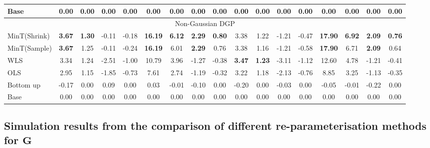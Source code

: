 \documentclass[12pt]{article}
\theoremstyle{definition}
\begin{document}
\begin{table}[H]
{\begin{tabular}{lcccccccccccccccc}
			Base & 0.00 & 0.00 & 0.00 & 0.00 & 0.00 & 0.00 & 0.00 & 0.00 & 0.00 & 0.00 & 0.00 & 0.00 & 0.00 & 0.00 & 0.00 & 0.00\\
			\toprule
			\multicolumn{17}{c}{Non-Gaussian DGP}\\
			\toprule
			
			MinT(Shrink) & \textbf{3.67} & \textbf{1.30} & -0.11 & -0.18 & \textbf{16.19} & \textbf{6.12} & \textbf{2.29} & \textbf{0.80} & 3.38 & 1.22 & -1.21 & -0.47 & \textbf{17.90} & \textbf{6.92} & \textbf{2.09} & \textbf{0.76}\\
			
			MinT(Sample) & \textbf{3.67} & 1.25 & -0.11 & -0.24 & \textbf{16.19} & 6.01 & \textbf{2.29} & 0.76 & 3.38 & 1.16 & -1.21 & -0.58 & \textbf{17.90} & 6.71 & \textbf{2.09} & 0.64\\
			
			WLS & 3.34 & 1.24 & -2.51 & -1.00 & 10.79 & 3.96 & -1.27 & -0.38 & \textbf{3.47} & \textbf{1.23} & -3.11 & -1.12 & 12.60 & 4.78 & -1.21 & -0.41\\
			
			OLS & 2.95 & 1.15 & -1.85 & -0.73 & 7.61 & 2.74 & -1.19 & -0.32 & 3.22 & 1.18 & -2.13 & -0.76 & 8.85 & 3.25 & -1.13 & -0.35\\
			
			Bottom up & -0.17 & 0.00 & 0.09 & 0.00 & 0.03 & -0.01 & -0.10 & 0.00 & -0.20 & 0.00 & -0.03 & 0.00 & -0.05 & -0.01 & -0.22 & 0.00\\
			
			Base & 0.00 & 0.00 & 0.00 & 0.00 & 0.00 & 0.00 & 0.00 & 0.00 & 0.00 & 0.00 & 0.00 & 0.00 & 0.00 & 0.00 & 0.00 & 0.00\\
			\bottomrule
		\end{tabular}
	}
\end{table}



\subsection{Simulation results from the comparison of different re-parameterisation methods for $\bm{G}$}\label{Appen:ReparaG_sim}
\end{document}
